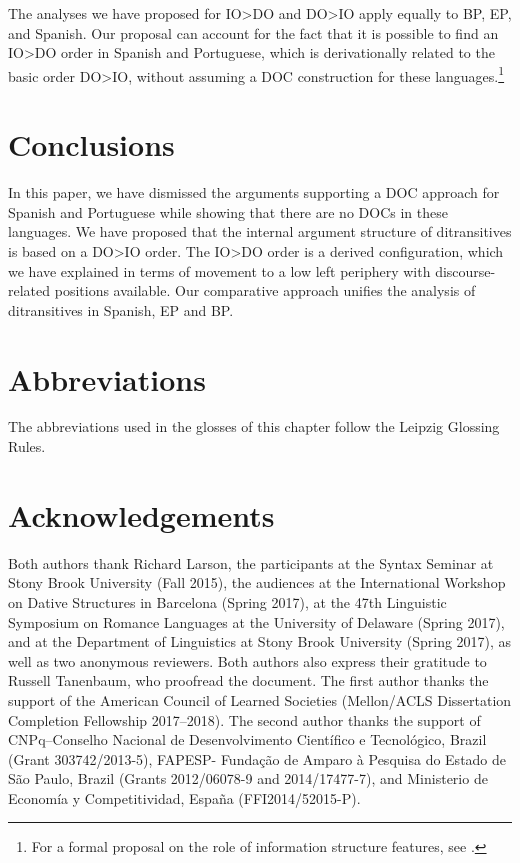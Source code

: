 \documentclass[output=paper,colorlinks,citecolor=brown,modfonts,nonflat]{langsci/langscibook}
\begin{document}
The analyses we have proposed for IO>DO and DO>IO apply equally to BP, EP, and Spanish. Our proposal can account for the fact that it is possible to find an IO>DO order in Spanish and Portuguese, which is derivationally related to the basic order DO>IO, without assuming a DOC construction for these languages.\footnote{For a formal proposal on the role of information structure features, see \citet{CépedaCyrino2017}.}

\section{Conclusions}\label{sec:cepeda:4}

In this paper, we have dismissed the arguments supporting a DOC approach for Spanish and Portuguese while showing that there are no DOCs in these languages. We have proposed that the internal argument structure of ditransitives is based on a DO>IO order. The IO>DO order is a derived configuration, which we have explained in terms of movement to a low left periphery with discourse-related positions available. Our comparative approach unifies the analysis of ditransitives in Spanish, EP and BP.

\section*{Abbreviations}
The abbreviations used in the glosses of this chapter follow the Leipzig Glossing Rules.

\section*{Acknowledgements}
Both authors thank Richard Larson, the participants at the Syntax Seminar at Stony Brook University (Fall 2015), the audiences at the International Workshop on Dative Structures in Barcelona (Spring 2017), at the 47th Linguistic Symposium on Romance Languages at the University of Delaware (Spring 2017), and at the Department of Linguistics at Stony Brook University (Spring 2017), as well as two anonymous reviewers. Both authors also express their gratitude to Russell Tanenbaum, who proofread the document. The first author thanks the support of the American Council of Learned Societies (Mellon/ACLS Dissertation Completion Fellowship 2017--2018). The second author thanks the support of CNPq–Conselho Nacional de Desenvolvimento Científico e Tecnológico, Brazil (Grant 303742/2013-5), FAPESP- Fundação de Amparo à Pesquisa do Estado de São Paulo, Brazil (Grants 2012/06078-9 and 2014/17477-7), and Ministerio de Economía y Competitividad, España (FFI2014/52015-P).

\sloppy\printbibliography[heading=subbibliography,notkeyword=this]
\end{document}
